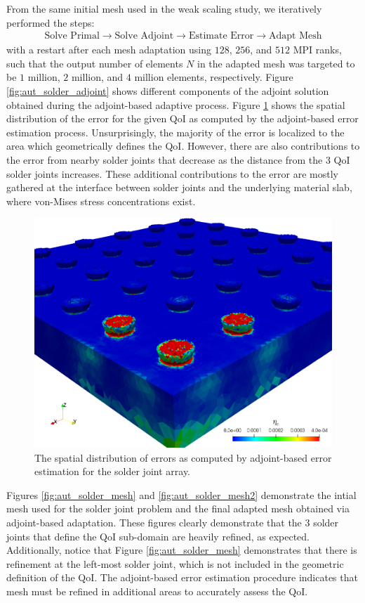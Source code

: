 From the same initial mesh used in the weak scaling study,
we iteratively performed the steps:
%
\begin{gather*}
\text{Solve Primal} \rightarrow \text{Solve Adjoint} \rightarrow
\text{Estimate Error} \rightarrow \text{Adapt Mesh}
\end{gather*}
%
with a restart after each mesh adaptation using $128$,
$256$, and $512$ MPI ranks, such that the output number
of elements $N$ in the adapted mesh was targeted to be
$1$ million, $2$ million, and $4$ million elements,
respectively. Figure \ref{fig:aut_solder_adjoint} shows
different components of the adjoint solution obtained
during the adjoint-based adaptive process.
Figure \ref{fig:aut_solder_error} shows
the spatial distribution of the error for the given
QoI as computed by the adjoint-based error estimation process.
Unsurprisingly, the majority of the error is localized to the
area which geometrically defines the QoI. However, there are
also contributions to the error from nearby solder joints that
decrease as the distance from the 3 QoI solder joints
increases. These additional contributions to the error
are mostly gathered at the interface between solder
joints and the underlying material slab, where von-Mises
stress concentrations exist.

\begin{figure}[ht!]
\centering
\includegraphics[width=.5\linewidth]{img/aut_solder_error.png}
\caption{The spatial distribution of errors as computed by
adjoint-based error estimation for the solder joint array.}
\label{fig:aut_solder_error}
\end{figure}

Figures \ref{fig:aut_solder_mesh} and \ref{fig:aut_solder_mesh2}
demonstrate the intial mesh used for the solder joint problem
and the final adapted mesh obtained via adjoint-based adaptation.
These figures clearly demonstrate that the 3 solder joints
that define the QoI sub-domain are heavily refined, as expected.
Additionally, notice that Figure \ref{fig:aut_solder_mesh}
demonstrates that there is refinement at the left-most solder joint,
which is not included in the geometric definition of the QoI.
The adjoint-based error estimation procedure indicates that
mesh must be refined in additional areas to accurately assess
the QoI.

